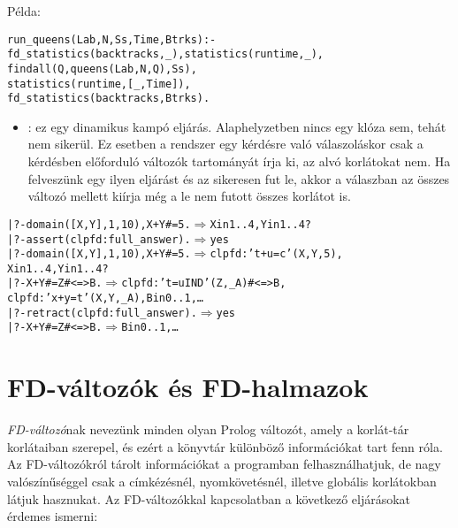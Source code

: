 Példa:

\begin{alltt}
% Az N-királynő feladat összes megoldása Ss, Lab címkézéssel való
% végrehajtása Time msec-ig tart és Btrks FD visszalépést igényel.
run_queens(Lab, N, Ss, Time, Btrks) :-
        fd_statistics(backtracks, _), statistics(runtime, _),
        findall(Q, queens(Lab, N, Q), Ss),
        statistics(runtime, [_,Time]),
        fd_statistics(backtracks, Btrks).
\end{alltt}

\begin{itemize}
\item {}: ez egy dinamikus kampó eljárás.
        Alaphelyzetben nincs egy klóza sem, tehát nem sikerül. Ez
        esetben a rendszer egy kérdésre való válaszoláskor csak a
        kérdésben előforduló változók tartományát írja ki, az alvó
        korlátokat nem. Ha felveszünk egy ilyen eljárást és az sikeresen
        fut le, akkor a válaszban az összes változó mellett kiírja még a
        le nem futott összes korlátot is.
\end{itemize}

\begin{alltt}
| ?- domain([X,Y], 1, 10), X+Y#=5. \(\Rightarrow\) X in 1..4, Y in 1..4 ?
| ?- assert(clpfd:full_answer).    \(\Rightarrow\) yes
| ?- domain([X,Y], 1, 10), X+Y#=5. \(\Rightarrow\) clpfd:'t+u=c'(X,Y,5),
                                      X in 1..4, Y in 1..4 ?
| ?- X+Y #= Z #<=> B.              \(\Rightarrow\) clpfd:'t=u IND'(Z,_A)#<=>B,
                                      clpfd:'x+y=t'(X,Y,_A), B in 0..1, \ldots
| ?- retract(clpfd:full_answer).   \(\Rightarrow\) yes
| ?- X+Y #= Z #<=> B.              \(\Rightarrow\) B in 0..1, \ldots
\end{alltt}

\section{FD-változók és FD-halmazok}
\label{fdset}

 \emph{FD-változó}nak nevezünk minden olyan Prolog változót,
amely a korlát-tár korlátaiban szerepel, és ezért a \clpfd könyvtár különböző
információkat tart fenn róla. Az FD-változókról tárolt információkat a
programban felhasználhatjuk, de nagy valószínűséggel csak a címkézésnél,
nyomkövetésnél, illetve globális korlátokban látjuk hasznukat.
\br
Az FD-változókkal kapcsolatban a következő eljárásokat érdemes ismerni:

